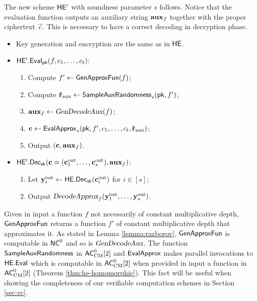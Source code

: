 \bigskip

The new scheme $\mathsf{HE'}$ with soundness parameter $s$ follows. Notice that the evaluation function outputs an auxiliary string $\mathbf{aux}_f$ together with the proper ciphertext $\vec{c}$. This is necessary to have a correct decoding in decryption phase.
\begin{framed}
\begin{itemize}
\item Key generation and encryption are the same as in  $\mathsf{HE}$.
\item $\mathsf{HE'.Eval}_{\mathsf{pk}}(f, c_1,\dots,c_t)$:
\begin{enumerate}
\item Compute $f' \gets \mathsf{GenApproxFun}(f)$;
\item Compute $\mathbf{\hat{r}}_{\text{aux}} \gets \mathsf{SampleAuxRandomness}_s(\mathsf{pk}, f')$;
\item $\mathbf{aux}_f \gets {\ensuremath{\textsl{GenDecodeAux}}}(f)$;
\item $\mathbf{c} \gets \mathsf{EvalApprox}_s(\mathsf{pk}, f', c_1,\dots, c_t, \mathbf{\hat{r}}_{\text{aux}})$;
\item Output $(\mathbf{c}, \mathbf{aux}_f)$.
\end{enumerate}
\item $\mathsf{HE'.Dec}_{\mathsf{sk}}(\mathbf{c} = (\mathbf{c}^{\text{out}}_1, \dots, \mathbf{c}^{\text{out}}_{s}), \mathbf{aux}_f)$:
\begin{enumerate}
\item Let $\mathbf{y}^{\text{out}}_i \gets \mathsf{HE.Dec}_{\mathsf{sk}}(\mathbf{c}^{\text{out}}_i)$ for $i \in [s]$;
\item Output ${\textsl{DecodeApprox}}_f(\mathbf{y}^{\text{out}}_1, \dots, \mathbf{y}^{\text{out}}_s)$.
\end{enumerate}
\end{itemize}
\end{framed}

\begin{remark}
Given in input a function $f$ not necessarily of constant multiplicative depth,  $\mathsf{GenApproxFun}$ returns a function $f'$ of constant multiplicative depth that approximates it.
As stated in Lemma \ref{lemma:razborov}, $\mathsf{GenApproxFun}$ is computable in ${\mathsf{NC}}^0$ and so is ${\textsl{GenDecodeAux}}$. The function $\mathsf{SampleAuxRandomness}$ in ${\mathsf{AC}}^0_{\text{CM}}[2]$ and $\mathsf{EvalApprox}$ makes parallel invocations to $\mathsf{HE.Eval}$ which is computable in ${\mathsf{AC}}^0_{\text{CM}}[2]$ when provided in input a function in ${\mathsf{AC}}^0_{\text{CM}}[2]$ (Theorem \ref{thm:he-homomorphic}). This fact will be useful when showing the completeness of our verifiable computation schemes in Section \ref{sec:vc}.
\end{remark}


